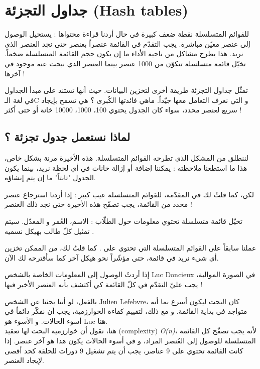 \chapter{جداول التجزئة (\textenglish{Hash tables})}

للقوائم المتسلسلة نقطة ضعف كبيرة في حال أردنا قراءة محتواها : يستحيل الوصول إلى عنصر معيّن مباشرة. يجب التقدّم في القائمة عنصراً بعنصر حتى نجد العنصر الذي نريد. هذا يطرح مشاكل من ناحية الأداء ما إن يكون حجم القائمة المتسلسلة ضخماً. تخيّل قائمة متسلسلة تتكوّن من 1000 عنصر بينما العنصر الذي نبحث عنه موجود في آخرها !

تمثّل جداول التجزئة طريقة أخرى لتخزين البيانات. حيث أنها تستند على مبدأ الجداول في لغة الـ\textenglish{C}
و التي نعرف التعامل معها جيّداً. ماهي فائدتها الكُبرى ؟ هي تسمح بإيجاد سريع لعنصر محدد، سواء كان الجدول يحتوي 100، 1000، 10000 خانة أو حتى أكثر !

\section{لماذا نستعمل جدول تجزئة ؟}

لننطلق من المشكل الذي تطرحه القوائم المتسلسلة. هذه الأخيرة مرنة بشكل خاص، هذا ما استطعنا ملاحظته : يمكننا إضافة أو إزالة خانات في أي لحظة نريد، بينما يكون الجدول "ثابتاً" ما إن يتم إنشاؤه.

لكن، كما قلتُ لك في المقدّمة، للقوائم المتسلسلة عيب كبير : إذا أردنا استرجاع عنصر محدد من القائمة، يجب تصفّح هذه الأخيرة حتى نجد ذلك العنصر !

تخيّل قائمة متسلسلة تحتوي معلومات حول الطلّاب : الاسم، العُمر و المعدّل. سيتم تمثيل كلّ طالب بهيكل نسميه
.

\begin{information}
عملنا سابقاً على القوائم المتسلسلة التي تحتوي على
.
 كما قلتُ لك، من الممكن تخزين أي شيء نريد في قائمة، حتى مؤشّراً نحو هيكل آخر كما سأقترحه لك الآن.
\end{information}

 إذا أردتُ الوصول إلى المعلومات الخاصة بالشخص
\textenglish{Luc Doncieux}
 في الصورة الموالية، يجب عليّ التقدّم في كلّ القائمة كي أكتشف بأنه العنصر الأخير فيها !
 

\begin{information}
بالفعل، لو أننا بحثنا عن الشخص 
\textenglish{Julien Lefebvre}،
كان البحث ليكون أسرع بما أنه متواجد في بداية القائمة. و مع ذلك، لتقييم كفاءة الخوارزمية، يجب أن نفكّر دائماً في أسوء الحالات. و الأسوء هو
\textenglish{Luc}
هنا.\\
هنا، نقول أن خوارزمية البحث لها تعقيد
(\textenglish{complexity})
\textit{\textenglish{O(n)}}،
لأنه يجب تصفّح كل القائمة المتسلسلة للوصول إلى العُنصر المراد، و في أسوء الحالات يكون هذا هو آخر عنصر. إذا كانت القائمة تحتوي على 9 عناصر، يجب أن يتم تشغيل 9 دورات للحلقة كحد أقصى لإيجاد العنصر.
\end{information}

